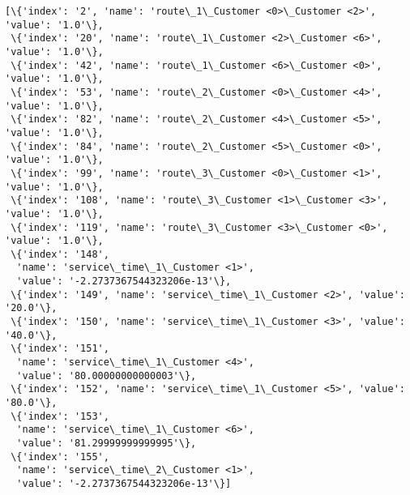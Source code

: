 \documentclass[11pt]{article}
\makeatletter
\newcommand{\boxspacing}{\kern\kvtcb@left@rule\kern\kvtcb@boxsep}
\newcommand{\prompt}[4]{
        {\ttfamily\llap{{\color{#2}[#3]:\hspace{3pt}#4}}\vspace{-\baselineskip}}
    }
\makeatother
\begin{document}
            \begin{tcolorbox}[breakable, size=fbox, boxrule=.5pt, pad at break*=1mm, opacityfill=0]
\prompt{Out}{outcolor}{8}{\boxspacing}
\begin{Verbatim}[commandchars=\\\{\}]
[\{'index': '2', 'name': 'route\_1\_Customer <0>\_Customer <2>', 'value': '1.0'\},
 \{'index': '20', 'name': 'route\_1\_Customer <2>\_Customer <6>', 'value': '1.0'\},
 \{'index': '42', 'name': 'route\_1\_Customer <6>\_Customer <0>', 'value': '1.0'\},
 \{'index': '53', 'name': 'route\_2\_Customer <0>\_Customer <4>', 'value': '1.0'\},
 \{'index': '82', 'name': 'route\_2\_Customer <4>\_Customer <5>', 'value': '1.0'\},
 \{'index': '84', 'name': 'route\_2\_Customer <5>\_Customer <0>', 'value': '1.0'\},
 \{'index': '99', 'name': 'route\_3\_Customer <0>\_Customer <1>', 'value': '1.0'\},
 \{'index': '108', 'name': 'route\_3\_Customer <1>\_Customer <3>', 'value': '1.0'\},
 \{'index': '119', 'name': 'route\_3\_Customer <3>\_Customer <0>', 'value': '1.0'\},
 \{'index': '148',
  'name': 'service\_time\_1\_Customer <1>',
  'value': '-2.2737367544323206e-13'\},
 \{'index': '149', 'name': 'service\_time\_1\_Customer <2>', 'value': '20.0'\},
 \{'index': '150', 'name': 'service\_time\_1\_Customer <3>', 'value': '40.0'\},
 \{'index': '151',
  'name': 'service\_time\_1\_Customer <4>',
  'value': '80.00000000000003'\},
 \{'index': '152', 'name': 'service\_time\_1\_Customer <5>', 'value': '80.0'\},
 \{'index': '153',
  'name': 'service\_time\_1\_Customer <6>',
  'value': '81.29999999999995'\},
 \{'index': '155',
  'name': 'service\_time\_2\_Customer <1>',
  'value': '-2.2737367544323206e-13'\}]
\end{Verbatim}
\end{tcolorbox}
        
    \begin{tcolorbox}[breakable, size=fbox, boxrule=1pt, pad at break*=1mm,colback=cellbackground, colframe=cellborder]
\prompt{In}{incolor}{ }{\boxspacing}
\begin{Verbatim}[commandchars=\\\{\}]

\end{Verbatim}
\end{tcolorbox}

    \begin{tcolorbox}[breakable, size=fbox, boxrule=1pt, pad at break*=1mm,colback=cellbackground, colframe=cellborder]
\prompt{In}{incolor}{ }{\boxspacing}
\begin{Verbatim}[commandchars=\\\{\}]

\end{Verbatim}
\end{tcolorbox}


    
    
    
\end{document}
